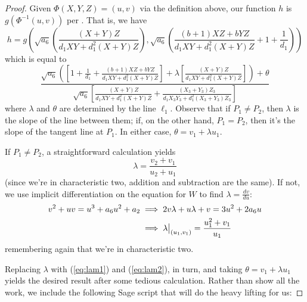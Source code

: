 \begin{proof}
Given $\Phi(X, Y, Z) = (u, v)$ via the definition above, our function $h$ is
    $g\left(\Phi^{-1}(u, v)\right)$ per \cite{das2008pairing}.
That is, we have
\[
h
    =   g\left(
        \sqrt{a_6}\left(\frac{(X + Y) Z}{d_1XY + d_1^2(X + Y)Z}\right)
        ,
        \sqrt{a_6}\left(\frac{(b + 1)XZ + bYZ}{d_1XY + d_1^2(X + Y)Z} + 1 +
            \frac{1}{d_1}\right)
        \right)
\]
    which is equal to
\begin{equation}\label{eq:g_miller}
\frac{
    \sqrt{a_6}\left(
        \left[
            1 + \frac{1}{d_1} + \frac{(b + 1)XZ + bYZ}{d_1XY + d_1^2(X + Y)Z}
        \right]
        + \lambda\left[
            \frac{(X + Y)Z}{d_1XY + d_1^2(X + Y)Z}
        \right]
    \right) + \theta
}{
    \sqrt{a_6}\left[
        \frac{(X + Y)Z}{d_1XY + d_1^2(X + Y)Z} +
        \frac{(X_3 + Y_3)Z_3}{d_1X_3Y_3 + d_1^2(X_3 + Y_3)Z_3}
    \right]
}
\end{equation}
    where $\lambda$ and $\theta$ are determined by the line $\ell_1$.
Observe that if $P_1 \ne P_2$, then $\lambda$ is the slope of the line between
    them; if, on the other hand, $P_1 = P_2$, then it's the slope of the
    tangent line at $P_1$.
In either case, $\theta = v_1 + \lambda u_1$.

If $P_1 \ne P_2$, a straightforward calculation yields
\begin{equation}\label{eq:lam1}
\lambda = \frac{v_2 + v_1}{u_2 + u_1}
\end{equation}
    (since we're in characteristic two, addition and subtraction are the same).
If not, we use implicit differentiation on the equation for $W$ to find
    $\lambda = \frac{dv}{du}$:
\begin{align}\label{eq:lam2}
v^2 + uv = u^3 + a_6u^2 + a_2
    &\implies   2v\lambda + u\lambda + v = 3u^2 + 2a_6u\notag\\
    &\implies   \lambda\big\vert_{(u_1, v_1)} = \frac{u_1^2 + v_1}{u_1}
\end{align}
    remembering again that we're in characteristic two.

Replacing $\lambda$ with (\ref{eq:lam1}) and (\ref{eq:lam2}), in turn, and
    taking $\theta = v_1 + \lambda u_1$ yields the desired result after some
    tedious calculation.
Rather than show all the work, we include the following Sage script that
    will do the heavy lifting for us:

\end{proof}


